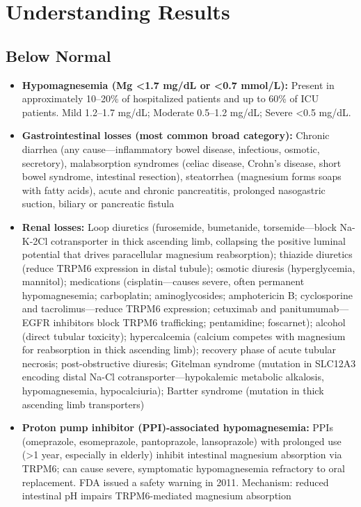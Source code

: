 \section*{Understanding Results}

\subsection*{Below Normal}
\begin{itemize}
  \item \textbf{Hypomagnesemia (Mg <1.7 mg/dL or <0.7 mmol/L):} Present in approximately 10--20\% of hospitalized patients and up to 60\% of ICU patients. Mild 1.2--1.7 mg/dL; Moderate 0.5--1.2 mg/dL; Severe <0.5 mg/dL.
  \item \textbf{Gastrointestinal losses (most common broad category):} Chronic diarrhea (any cause---inflammatory bowel disease, infectious, osmotic, secretory), malabsorption syndromes (celiac disease, Crohn's disease, short bowel syndrome, intestinal resection), steatorrhea (magnesium forms soaps with fatty acids), acute and chronic pancreatitis, prolonged nasogastric suction, biliary or pancreatic fistula
  \item \textbf{Renal losses:} Loop diuretics (furosemide, bumetanide, torsemide---block Na-K-2Cl cotransporter in thick ascending limb, collapsing the positive luminal potential that drives paracellular magnesium reabsorption); thiazide diuretics (reduce TRPM6 expression in distal tubule); osmotic diuresis (hyperglycemia, mannitol); medications (cisplatin---causes severe, often permanent hypomagnesemia; carboplatin; aminoglycosides; amphotericin B; cyclosporine and tacrolimus---reduce TRPM6 expression; cetuximab and panitumumab---EGFR inhibitors block TRPM6 trafficking; pentamidine; foscarnet); alcohol (direct tubular toxicity); hypercalcemia (calcium competes with magnesium for reabsorption in thick ascending limb); recovery phase of acute tubular necrosis; post-obstructive diuresis; Gitelman syndrome (mutation in SLC12A3 encoding distal Na-Cl cotransporter---hypokalemic metabolic alkalosis, hypomagnesemia, hypocalciuria); Bartter syndrome (mutation in thick ascending limb transporters)
  \item \textbf{Proton pump inhibitor (PPI)-associated hypomagnesemia:} PPIs (omeprazole, esomeprazole, pantoprazole, lansoprazole) with prolonged use (>1 year, especially in elderly) inhibit intestinal magnesium absorption via TRPM6; can cause severe, symptomatic hypomagnesemia refractory to oral replacement. FDA issued a safety warning in 2011. Mechanism: reduced intestinal pH impairs TRPM6-mediated magnesium absorption

\end{itemize}
